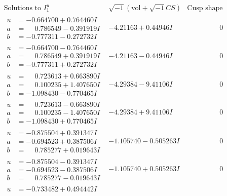 \documentclass[1p]{elsarticle_modified}
\theoremstyle{definition}
\newcommand{\I}{\sqrt{-1}}
\begin{document}
$$\begin{array}{c|c|c}  
\text{Solutions to }I^u_{1}& \I (\text{vol} + \sqrt{-1}CS) & \text{Cusp shape}\\
 \hline 
\begin{aligned}
u &= -0.664700 + 0.764460 I \\
a &= \phantom{-}0.786549 - 0.391919 I \\
b &= -0.777311 - 0.272732 I\end{aligned}
 & -4.21163 + 0.44946 I & \phantom{-0.000000 } 0 \\ \hline\begin{aligned}
u &= -0.664700 - 0.764460 I \\
a &= \phantom{-}0.786549 + 0.391919 I \\
b &= -0.777311 + 0.272732 I\end{aligned}
 & -4.21163 - 0.44946 I & \phantom{-0.000000 } 0 \\ \hline\begin{aligned}
u &= \phantom{-}0.723613 + 0.663890 I \\
a &= \phantom{-}0.100235 + 1.407650 I \\
b &= -1.098430 - 0.770465 I\end{aligned}
 & -4.29384 - 9.41106 I & \phantom{-0.000000 } 0 \\ \hline\begin{aligned}
u &= \phantom{-}0.723613 - 0.663890 I \\
a &= \phantom{-}0.100235 - 1.407650 I \\
b &= -1.098430 + 0.770465 I\end{aligned}
 & -4.29384 + 9.41106 I & \phantom{-0.000000 } 0 \\ \hline\begin{aligned}
u &= -0.875504 + 0.391347 I \\
a &= -0.694523 + 0.387506 I \\
b &= \phantom{-}0.785277 + 0.019643 I\end{aligned}
 & -1.105740 - 0.505263 I & \phantom{-0.000000 } 0 \\ \hline\begin{aligned}
u &= -0.875504 - 0.391347 I \\
a &= -0.694523 - 0.387506 I \\
b &= \phantom{-}0.785277 - 0.019643 I\end{aligned}
 & -1.105740 + 0.505263 I & \phantom{-0.000000 } 0 \\ \hline\begin{aligned}
u &= -0.733482 + 0.494442 I \\

\end{aligned}
\end{array}$$
\end{document}
